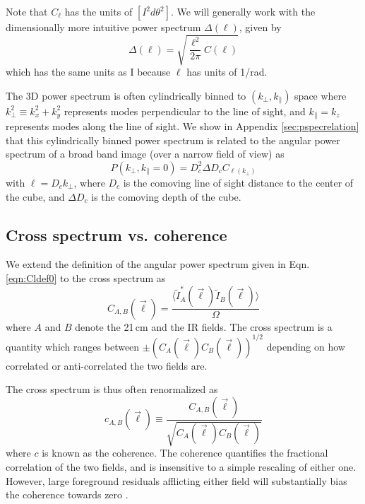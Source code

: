 \documentclass[preprint]{aastex}
\begin{document}
Note that $C_\ell$ has the units of $[I^2d\theta^2]$. We will generally work with the dimensionally more intuitive power spectrum $\Delta(\ell)$, given by
\begin{equation}
	\Delta(\ell)=\sqrt{\frac{\ell^2}{2\pi}C(\ell)}
\end{equation}
which has the same units as I because $\ell$ has units of 1/rad. 

The 3D power spectrum is often cylindrically binned to $(k_\perp,k_\parallel)$ space where $k_\perp^2\equiv k_x^2+k_y^2$ represents modes perpendicular to the line of sight, and $k_\parallel=k_z$ represents modes along the line of sight. We show in Appendix \ref{sec:pspecrelation}  that this cylindrically binned power spectrum is related to the angular power spectrum of a broad band image (over a narrow field of view) as
\begin{equation}
P(k_\perp,k_\parallel=0)=D_c^2 \Delta D_c C_{\ell(k_\perp)}	
\end{equation}
with $\ell=D_c k_\perp$, where $D_c$ is the comoving line of sight distance to the center of the cube, and $\Delta D_c$ is the comoving depth of the cube.

\subsection{Cross spectrum vs. coherence}

We extend the definition of the angular power spectrum given in Eqn. \ref{eqn:Cldef0} to the cross spectrum as
\begin{equation}
\label{eqn:Cldefcross}
	C_{A,B}(\vec{\ell}) = \frac{\langle \tilde{I}_A^*(\vec{\ell})\tilde{I}_B(\vec{\ell})\rangle}{\Omega}
\end{equation}
where $A$ and $B$ denote the 21\,cm and the IR fields. The cross spectrum is a quantity which ranges between $\pm(C_{A}(\vec{\ell})C_{B}(\vec{\ell}))^{1/2}$ depending on how correlated or anti-correlated the two fields are. 

The cross spectrum is thus often renormalized as  
\begin{equation}
\label{eqn:Cldefcross}
	c_{A,B}(\vec{\ell}) \equiv \frac{C_{A,B}(\vec{\ell}) }{\sqrt{C_A(\vec{\ell})  C_B(\vec{\ell}) }}
\end{equation}
where $c$ is known as the coherence. The coherence quantifies the fractional correlation of the two fields, and is insensitive to a simple rescaling of either one. However, large foreground residuals afflicting either field will substantially bias the coherence towards zero \citep{lidz09,furlanettolidz07}. 
\end{document}
